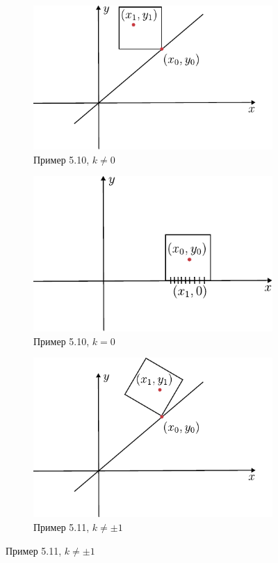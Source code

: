 \documentclass[document]{subfiles}
\begin{document}
\begin{figure}
    \begin{subfigure}[h]{0.50\textwidth}
        \includegraphics*{images/chapter5/example1_1.pdf}\caption{Пример 5.10, $k \ne 0$}
    \end{subfigure}
    \begin{subfigure}[h]{0.40\textwidth}
        \includegraphics*{images/chapter5/example1_2.pdf}\caption{Пример 5.10, $k = 0$}
    \end{subfigure}
    \begin{subfigure}[h]{0.50\textwidth}
        \includegraphics*{images/chapter5/example2_1.pdf}\caption{Пример 5.11, $k \ne \pm 1$}

\end{subfigure}
\end{figure}
\end{document}
